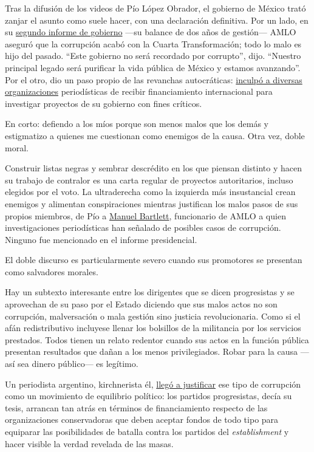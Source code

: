 Tras la difusión de los videos de Pío López Obrador, el gobierno de
México trató zanjar el asunto como suele hacer, con una declaración
definitiva. Por un lado, en su
\href{https://www.forbes.com.mx/politica-he-cumplido-95-de-mis-100-compromisos-presume-amlo-en-segundo-informe-de-gobierno/}{segundo
informe de gobierno} ---su balance de dos años de gestión--- AMLO
aseguró que la corrupción acabó con la Cuarta Transformación; todo lo
malo es hijo del pasado. ``Este gobierno no será recordado por
corrupto'', dijo. ``Nuestro principal legado será purificar la vida
pública de México y estamos avanzando''. Por el otro, dio un paso propio
de las revanchas autocráticas:
\href{https://www.lavanguardia.com/politica/20200828/483139613276/acusan-al-gobierno-de-mexico-de-estigmatizar-a-ong-que-critican-al-tren-maya.html}{inculpó
a diversas organizaciones} periodísticas de recibir financiamiento
internacional para investigar proyectos de su gobierno con fines
críticos.

En corto: defiendo a los míos porque son menos malos que los demás y
estigmatizo a quienes me cuestionan como enemigos de la causa. Otra vez,
doble moral.

Construir listas negras y sembrar descrédito en los que piensan distinto
y hacen su trabajo de contralor es una carta regular de proyectos
autoritarios, incluso elegidos por el voto. La ultraderecha como la
izquierda más insustancial crean enemigos y alimentan conspiraciones
mientras justifican los malos pasos de sus propios miembros, de Pío a
\href{https://cnnespanol.cnn.com/2019/12/20/tres-datos-que-debes-saber-sobre-manuel-bartlett-diaz-director-de-la-cfe/}{Manuel
Bartlett}, funcionario de AMLO a quien investigaciones periodísticas han
señalado de posibles casos de corrupción. Ninguno fue mencionado en el
informe presidencial.

El doble discurso es particularmente severo cuando sus promotores se
presentan como salvadores morales.

Hay un subtexto interesante entre los dirigentes que se dicen
progresistas y se aprovechan de su paso por el Estado diciendo que sus
malos actos no son corrupción, malversación o mala gestión sino justicia
revolucionaria. Como si el afán redistributivo incluyese llenar los
bolsillos de la militancia por los servicios prestados. Todos tienen un
relato redentor cuando sus actos en la función pública presentan
resultados que dañan a los menos privilegiados. Robar para la causa
---así sea dinero público--- es legítimo.

Un periodista argentino, kirchnerista él,
\href{https://www.tiempoar.com.ar/nota/y-si-hablamos-de-corrupcion-en-serio}{llegó
a justificar} ese tipo de corrupción como un movimiento de equilibrio
político: los partidos progresistas, decía su tesis, arrancan tan atrás
en términos de financiamiento respecto de las organizaciones
conservadoras que deben aceptar fondos de todo tipo para equiparar las
posibilidades de batalla contra los partidos del \emph{establishment} y
hacer visible la verdad revelada de las masas.


